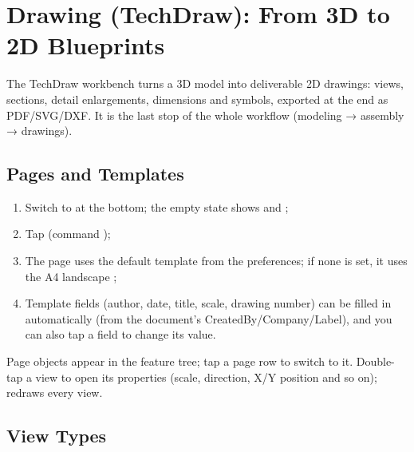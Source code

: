 \chapter{Drawing (TechDraw): From 3D to 2D Blueprints}

The TechDraw workbench turns a 3D model into deliverable 2D drawings: views, sections, detail
enlargements, dimensions and symbols, exported at the end as PDF/SVG/DXF. It is the last stop of the
whole workflow (modeling → assembly → drawings).

\section{Pages and Templates}

\begin{enumerate}
  \item Switch to  at the bottom; the empty state shows  and
        ;
  \item Tap  (command );
  \item The page uses the default template from the preferences; if none is set, it uses the A4
        landscape ;
  \item Template fields (author, date, title, scale, drawing number) can be filled in automatically
        (from the document's CreatedBy/Company/Label), and you can also tap a field to change its
        value.
\end{enumerate}

Page objects appear in the feature tree; tap a page row to switch to it. Double-tap a view to open
its properties (scale, direction, X/Y position and so on);  redraws every view.

\section{View Types}

